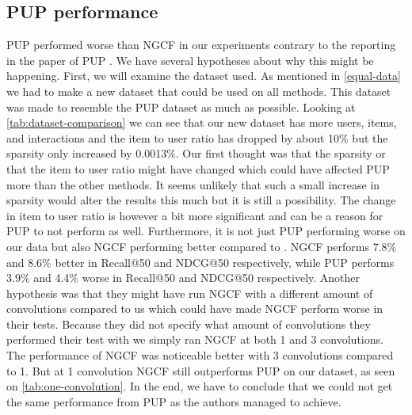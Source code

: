 \subsection{PUP performance}
PUP performed worse than NGCF in our experiments contrary to the reporting in the paper of PUP \cite{Priceaware}.
We have several hypotheses about why this might be happening.
First, we will examine the dataset used.
As mentioned in \autoref{equal-data} we had to make a new dataset that could be used on all methods.
This dataset was made to resemble the PUP dataset as much as possible.
Looking at \autoref{tab:dataset-comparison} we can see that our new dataset has more users, items, and interactions and the item to user ratio has dropped by about 10\% but the sparsity only increased by 0.0013\%.
Our first thought was that the sparsity or that the item to user ratio might have changed which could have affected PUP more than the other methods.
It seems unlikely that such a small increase in sparsity would alter the results this much but it is still a possibility.
The change in item to user ratio is however a bit more significant and can be a reason for PUP to not perform as well.
Furthermore, it is not just PUP performing worse on our data but also NGCF performing better compared to \cite{Priceaware}.
NGCF performs 7.8\% and 8.6\% better in Recall@50 and NDCG@50 respectively, while PUP performs 3.9\% and 4.4\% worse in Recall@50 and NDCG@50 respectively.
Another hypothesis was that they might have run NGCF with a different amount of convolutions compared to us which could have made NGCF perform worse in their tests.
Because they did not specify what amount of convolutions they performed their test with we simply ran NGCF at both 1 and 3 convolutions.
The performance of NGCF was noticeable better with 3 convolutions compared to 1.
But at 1 convolution NGCF still outperforms PUP on our dataset, as seen on \autoref{tab:one-convolution}.
In the end, we have to conclude that we could not get the same performance from PUP as the authors managed to achieve.
